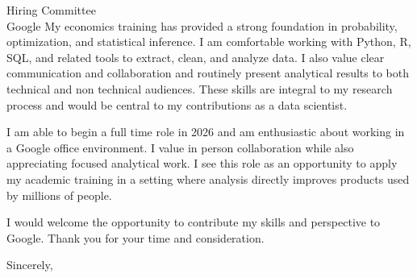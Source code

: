 \documentclass[11pt]{letter}
\begin{document}
\begin{letter}{Hiring Committee \\ Google}
My economics training has provided a strong foundation in probability, optimization, and statistical inference. I am comfortable working with Python, R, SQL, and related tools to extract, clean, and analyze data. I also value clear communication and collaboration and routinely present analytical results to both technical and non technical audiences. These skills are integral to my research process and would be central to my contributions as a data scientist.

I am able to begin a full time role in 2026 and am enthusiastic about working in a Google office environment. I value in person collaboration while also appreciating focused analytical work. I see this role as an opportunity to apply my academic training in a setting where analysis directly improves products used by millions of people.

I would welcome the opportunity to contribute my skills and perspective to Google. Thank you for your time and consideration.

\closing{Sincerely,}

\end{letter}
\end{document}
